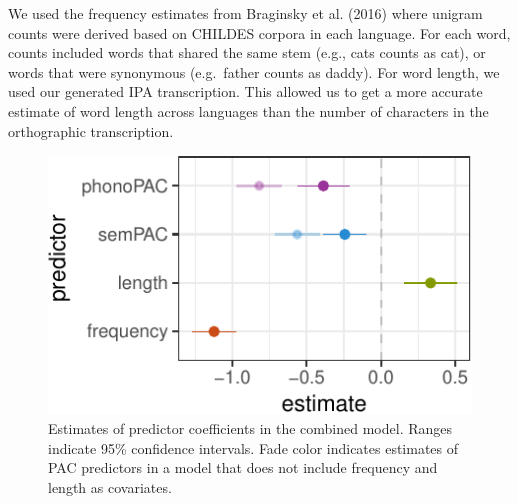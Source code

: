\documentclass[10pt, letterpaper]{article}
\newenvironment{CodeChunk}{}{}
\begin{document}
We used the frequency estimates from Braginsky et al. (2016) where
unigram counts were derived based on CHILDES corpora in each language.
For each word, counts included words that shared the same stem (e.g.,
cats counts as cat), or words that were synonymous (e.g.~father counts
as daddy). For word length, we used our generated IPA transcription.
This allowed us to get a more accurate estimate of word length across
languages than the number of characters in the orthographic
transcription.

\begin{CodeChunk}
\begin{figure}[H]

{\centering \includegraphics{figs/regressions_all_img-1} 

}

\caption{\label{fig:regressions_all_img}Estimates of predictor coefficients in the combined model. Ranges indicate 95\% confidence intervals. Fade color indicates estimates of PAC predictors in a model that does not include frequency and length as covariates.}\label{fig:regressions_all_img}
\end{figure}
\end{CodeChunk}
\end{document}
